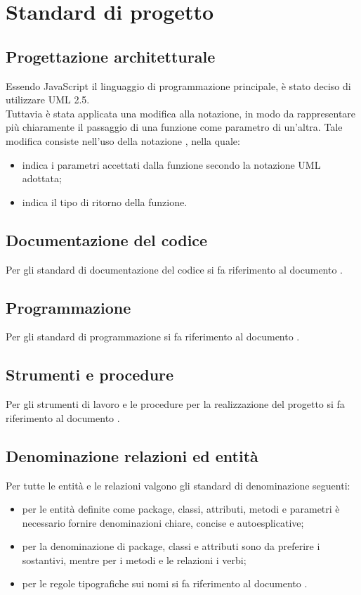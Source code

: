 \section{Standard di progetto}
\subsection{Progettazione architetturale}
Essendo JavaScript il linguaggio di programmazione principale, è stato 
deciso di utilizzare UML 2.5. \\
Tuttavia è stata applicata una modifica alla notazione, in modo da rappresentare più chiaramente il passaggio di una funzione come parametro di un'altra.
Tale modifica consiste nell’uso della notazione , nella quale:
\begin{itemize}
	\item {} indica i parametri accettati dalla funzione secondo la notazione UML adottata;
	\item {} indica il tipo di ritorno della funzione.
\end{itemize}
\subsection{Documentazione del codice}
Per gli standard di documentazione del codice si fa riferimento al documento \NPdoc.
\subsection{Programmazione}
Per gli standard di programmazione si fa riferimento al documento \NPdoc.
\subsection{Strumenti e procedure}
Per gli strumenti di lavoro e le procedure per la realizzazione del progetto si fa riferimento al documento \NPdoc.
\subsection{Denominazione relazioni ed entità}
Per tutte le entità e le relazioni valgono gli standard di denominazione seguenti:
\begin{itemize}
	\item per le entità definite come package, classi, attributi, metodi e parametri è necessario fornire denominazioni chiare, concise e autoesplicative;
	\item per la denominazione di package, classi e attributi sono da preferire i sostantivi, mentre per i metodi e le relazioni i verbi;
	\item per le regole tipografiche sui nomi si fa riferimento al documento \NPdoc.
\end{itemize}